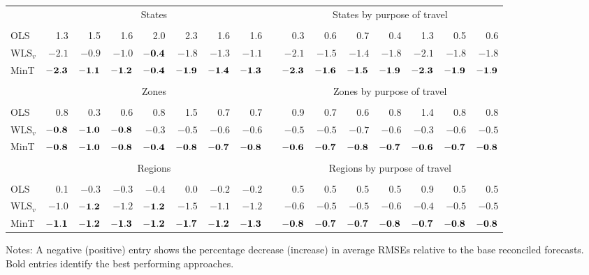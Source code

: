 \documentclass[10pt,a4paper]{article}
\begin{document}
\begin{enumerate}
{\begin{table*}[!htb]
\begin{threeparttable}
\begin{tabular}{lrrrrrrrrrrrrrrr}
				& \multicolumn{7}{c}{States} &  & \multicolumn{7}{c}{States by purpose of travel} \\
				\cline{2-8}\cline{10-16} \\[-0.3cm]
				OLS & 1.3 & 1.5 & 1.6 & 2.0 & 2.3 & 1.6 & 1.6 & & 0.3 & 0.6 & 0.7 & 0.4 & 1.3 & 0.5 & 0.6 \\
				WLS$_v$ & $-2.1$ & $-0.9$ & $-1.0$ & $\bf{ -0.4}$ & $-1.8$ & $-1.3$ & $-1.1$ & & $-2.1$ & $-1.5$ & $-1.4$ & $-1.8$ & $-2.1$ & $-1.8$ & $-1.8$ \\
				MinT & $\bf{ -2.3}$ & $\bf{ -1.1}$ & $\bf{ -1.2}$ & $\bf{ -0.4}$ & $\bf{ -1.9}$ & $\bf{ -1.4}$ & $\bf{ -1.3}$ & & $\bf{ -2.3}$ & $\bf{ -1.6}$ & $\bf{ -1.5}$ & $\bf{ -1.9}$ & $\bf{ -2.3}$ & $\bf{ -1.9}$ & $\bf{ -1.9}$ \\
				\cline{2-8}\cline{10-16} \\[-0.3cm]
				& \multicolumn{7}{c}{Zones} & & \multicolumn{7}{c}{Zones by purpose of travel} \\
				\cline{2-8}\cline{10-16} \\[-0.3cm]
				OLS & 0.8 & 0.3 & 0.6 & 0.8 & 1.5 & 0.7 & 0.7 & & 0.9 & 0.7 & 0.6 & 0.8 & 1.4 & 0.8 & 0.8 \\
				WLS$_v$ & $\bf{ -0.8}$ & $\bf{ -1.0}$ & $\bf{ -0.8}$ & $-0.3$ & $-0.5$ & $-0.6$ & $-0.6$ & & $-0.5$ & $-0.5$ & $-0.7$ & $-0.6$ & $-0.3$ & $-0.6$ & $-0.5$ \\
				MinT & $\bf{ -0.8}$ & $\bf{ -1.0}$ & $\bf{ -0.8}$ & $\bf{ -0.4}$ & $\bf{ -0.8}$ & $\bf{ -0.7}$ & $\bf{ -0.8}$ & & $\bf{ -0.6}$ & $\bf{ -0.7}$ & $\bf{ -0.8}$ & $\bf{ -0.7}$ & $\bf{ -0.6}$ & $\bf{ -0.7}$ & $\bf{ -0.8}$ \\
				\cline{2-8}\cline{10-16} \\[-0.3cm]
				& \multicolumn{7}{c}{Regions} & & \multicolumn{7}{c}{Regions by purpose of travel} \\
				\cline{2-8}\cline{10-16} \\[-0.3cm]
				OLS  & 0.1 & $-0.3$ & $-0.3$ & $-0.4$ & 0.0 & $-0.2$ & $-0.2$ & & 0.5 & 0.5 & 0.5 & 0.5 & 0.9 & 0.5 & 0.5\\
				WLS$_v$ & $-1.0$ & $\bf{ -1.2}$ & $-1.2$ & $\bf{ -1.2}$ & $-1.5$ & $-1.1$ & $-1.2$ & & $-0.6$ & $-0.5$ & $-0.5$ & $-0.6$ & $-0.4$ & $-0.5$ & $-0.5$ \\
				MinT & $\bf{ -1.1}$ & $\bf{ -1.2}$ & $\bf{ -1.3}$ & $\bf{ -1.2}$ & $\bf{ -1.7}$ & $\bf{ -1.2}$ & $\bf{ -1.3}$ & & $\bf{ -0.8}$ & $\bf{ -0.7}$ & $\bf{ -0.7}$ & $\bf{ -0.8}$ & $\bf{ -0.7}$ & $\bf{ -0.8}$ & $\bf{ -0.8}$ \\
				\bottomrule
			\end{tabular}
		\end{threeparttable}
	\end{table*}

}
\end{enumerate}
\end{document}
